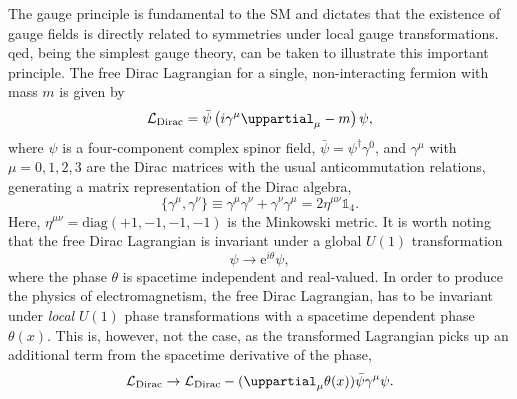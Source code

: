The gauge principle is fundamental to the SM and dictates that the existence of gauge fields is directly related to symmetries under local gauge transformations. \gls{qed}, being the simplest gauge theory, can be taken to illustrate this important principle. The free Dirac Lagrangian for a single, non-interacting fermion with mass $m$ is given by
\begin{equation}
	\Lagr_\mathrm{Dirac}=\bar{\psi}\left(i\gamma^\mu\uppartial_\mu - m\right)\psi,
	\label{eq:dirac_lagrangian}
\end{equation}
where $\psi$ is a four-component complex spinor field, $\bar{\psi} = \psi^\dagger\gamma^0$, and $\gamma^\mu$ with $\mu = 0,1,2,3 $ are the Dirac matrices with the usual anticommutation relations, generating a matrix representation of the Dirac algebra, 
\begin{equation}
	\{\gamma^\mu,\gamma^\nu\} \equiv \gamma^\mu\gamma^\nu + \gamma^\nu\gamma^\mu = 2\eta^{\mu\nu}\mathbb{1}_4.
\end{equation}
Here, $\eta^{\mu\nu} = \mathrm{diag}(+1, -1, -1, -1)$ is the Minkowski metric.
It is worth noting that the free Dirac Lagrangian is invariant under a global $U(1)$ transformation
\begin{equation}
	\psi \rightarrow \mathrm{e}^{i\theta}\psi,
\end{equation}
where the phase $\theta$ is spacetime independent and real-valued. In order to produce the physics of electromagnetism, the free Dirac Lagrangian, has to be invariant under \textit{local} $U(1)$ phase transformations with a spacetime dependent phase $\theta(x)$. This is, however, not the case, as the transformed Lagrangian picks up an additional term from the spacetime derivative of the phase,
\begin{equation}
	\Lagr_\mathrm{Dirac} \to \Lagr_\mathrm{Dirac} - (\uppartial_\mu\theta(x))\bar{\psi}\gamma^\mu\psi.
\end{equation}

